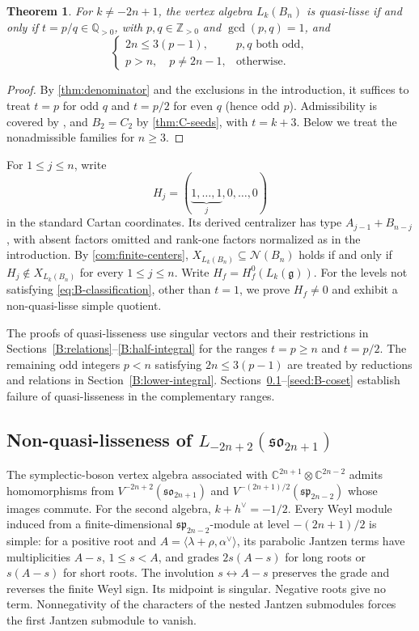 \documentclass[11pt,a4paper]{amsart}
\numberwithin{equation}{section}
\newtheorem{theorem}{Theorem}[section]
\theoremstyle{definition}
\theoremstyle{remark}
\newcommand{\C}{\mathbb C}
\newcommand{\Z}{\mathbb Z}
\newcommand{\Q}{\mathbb Q}
\newcommand{\g}{\mathfrak g}
\newcommand{\N}{\mathcal N}
\newcommand{\spg}{\mathfrak{sp}}
\newcommand{\sog}{\mathfrak{so}}
\begin{document}
\begin{theorem}\label{thm:B-classification}
For $k\ne-2n+1$, the vertex algebra $L_k(B_n)$ is quasi-lisse if and
only if $t=p/q\in\Q_{>0}$, with $p,q\in\Z_{>0}$ and
$\gcd(p,q)=1$, and
\begin{equation}\label{eq:B-classification}
 \begin{cases}
  2n\le3(p-1),&p,q\text{ both odd},\\
  p>n,\quad p\ne2n-1,&\text{otherwise}.
 \end{cases}
\end{equation}
\end{theorem}
\begin{proof}
By \cref{thm:denominator} and the exclusions in the introduction, it suffices
to treat $t=p$ for odd $q$ and $t=p/2$ for even $q$ (hence odd $p$).
Admissibility is covered by \cite{AAV}, and $B_2=C_2$ by
\cref{thm:C-seeds}, with $t=k+3$. Below we treat the nonadmissible
families for $n\ge3$.
\end{proof}

For $1\le j\le n$, write
$$
 H_j=(\underbrace{1,\ldots,1}_{j},0,\ldots,0)
$$
in the standard Cartan coordinates. Its derived centralizer has type
$A_{j-1}+B_{n-j}$, with absent factors omitted and rank-one factors
normalized as in the introduction. By \cref{com:finite-centers},
$X_{L_k(B_n)}\subseteq\N(B_n)$ holds if and only if
$H_j\notin X_{L_k(B_n)}$ for every $1\le j\le n$.
Write $H_f=H_f^0(L_k(\g))$. For the levels not satisfying \eqref{eq:B-classification}, other than $t=1$,
we prove $H_f\ne0$ and exhibit a non-quasi-lisse simple quotient.

The proofs of quasi-lisseness use singular vectors and their restrictions
in Sections~\ref{B:relations}--\ref{B:half-integral} for the ranges
$t=p\ge n$ and $t=p/2$. The remaining odd integers $p<n$ satisfying
$2n\le3(p-1)$ are treated by reductions and relations in
Section~\ref{B:lower-integral}. Sections~\ref{B:shift-one}--\ref{seed:B-coset}
establish failure of quasi-lisseness in the complementary ranges.

\subsection{\texorpdfstring{Non-quasi-lisseness of $L_{-2n+2}(\sog_{2n+1})$}{Non-quasi-lisseness of L(-2n+2)(so(2n+1))}}\label{B:shift-one}
The symplectic-boson vertex algebra associated with
$\C^{2n+1}\otimes\C^{2n-2}$ admits homomorphisms from
$V^{-2n+2}(\sog_{2n+1})$ and $V^{-(2n+1)/2}(\spg_{2n-2})$
whose images commute. For the second algebra, $k+h^\vee=-1/2$.
Every Weyl module induced from a finite-dimensional
$\spg_{2n-2}$-module at level $-(2n+1)/2$ is simple: for a positive root and
$A=\langle\lambda+\rho,\alpha^\vee\rangle$, its parabolic Jantzen
terms have multiplicities $A-s$, $1\le s<A$, and grades
$2s(A-s)$ for long roots or $s(A-s)$ for short roots.
The involution $s\leftrightarrow A-s$ preserves the grade and reverses
the finite Weyl sign. Its midpoint is singular. Negative roots give
no term. Nonnegativity of the characters of the nested Jantzen submodules
forces the first Jantzen submodule to vanish.
\end{document}
